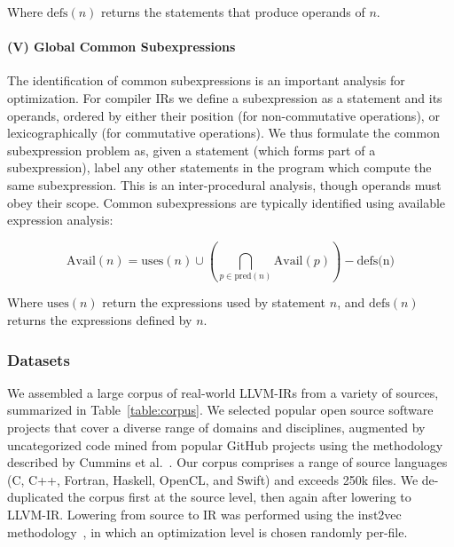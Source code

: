 Where $\text{defs}(n)$ returns the statements that produce operands of
$n$.

\paragraph{(V) Global Common Subexpressions} The identification of
common subexpressions is an important analysis for optimization. For
compiler IRs we define a subexpression as a statement and its
operands, ordered by either their position (for non-commutative
operations), or lexicographically (for commutative operations). We
thus formulate the common subexpression problem as, given a statement
(which forms part of a subexpression), label any other statements in
the program which compute the same subexpression. This is an
inter-procedural analysis, though operands must obey their
scope. Common subexpressions are typically identified using available
expression analysis:

\begin{equation*}
\text{Avail}(n) = \text{uses}(n) \cup \left( \bigcap_{p \in \text{pred}(n)} \text{Avail}(p) \right) - \text{defs(n)}
\end{equation*}

Where $\text{uses}(n)$ return the expressions used by statement $n$,
and $\text{defs}(n)$ returns the expressions defined by $n$.


\subsubsection{Datasets}

We assembled a large corpus of real-world LLVM-IRs from a variety of
sources, summarized in Table~\ref{table:corpus}. We selected popular
open source software projects that cover a diverse range of domains
and disciplines, augmented by uncategorized code mined from popular
GitHub projects using the methodology described by Cummins et
al.~\cite{Cummins2017a}. Our corpus comprises a range of source
languages (C, C++, Fortran, Haskell, OpenCL, and Swift) and exceeds
250k files. We de-duplicated the corpus first at the source level,
then again after lowering to LLVM-IR. Lowering from source to IR was
performed using the inst2vec methodology~\cite{Ben-nun2018}, in which
an optimization level is chosen randomly per-file.

\begin{table}
  \centering%
  \vspace{.5em}
  \caption{%
    The ten sources of LLVM-IR used to produce datasets for evaluating
    data flow analyses. Our corpus comprises six programming languages
    from functional to imperative, high-level to accelerators. The
    software covers a broad range of disciplines from compilers and
    operating systems to traditional benchmarks, machine learning
    systems, and unclassified code downloaded from popular open source
    repositories.%
  }%
  \label{table:corpus} %
\end{table}

